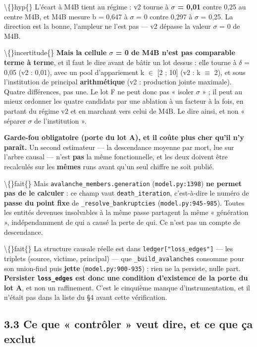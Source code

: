 \documentclass[11pt,a4paper]{article}
\newcommand{\code}[1]{\texttt{#1}}
\begin{document}
\textbackslash\{\}hyp\{\} L'écart à M4B tient au régime : v2 tourne à \textbf{\ensuremath{\sigma} = 0,01} contre 0,25 au centre M4B, et M4B mesure b = 0,647 à \ensuremath{\sigma} = 0 contre 0,297 à \ensuremath{\sigma} = 0,25. La direction est la bonne, l'ampleur ne l'est pas --- v2 dépasse la valeur \ensuremath{\sigma} = 0 de M4B.

\textbackslash\{\}incertitude\{\} \textbf{Mais la cellule \ensuremath{\sigma} = 0 de M4B n'est pas comparable terme à terme}, et il faut le dire avant de bâtir un lot dessus : elle tourne à \ensuremath{\delta} = 0,05 (v2 : 0,01), avec un pool d'appariement k \ensuremath{\in} [2 ; 10] (v2 : k \ensuremath{\equiv} 2), et sous l'institution de principal \textbf{arithmétique} (v2 : production jointe maximale). Quatre différences, pas une. Le lot F ne peut donc pas « isoler \ensuremath{\sigma} » ; il peut au mieux ordonner les quatre candidats par une ablation à un facteur à la fois, en partant du régime v2 et en marchant vers celui de M4B. Le dire ainsi, et non « séparer \ensuremath{\sigma} de l'institution ».

\textbf{Garde-fou obligatoire (porte du lot A), et il coûte plus cher qu'il n'y paraît.} Un second estimateur --- la descendance moyenne par mort, lue sur l'arbre causal --- n'est \textbf{pas} la même fonctionnelle, et les deux doivent être recalculés sur les \textbf{mêmes} runs avant qu'un seul chiffre ne soit publié.

\textbackslash\{\}fait\{\} Mais \code{avalanche\_members.generation} (\code{model.py:1398}) \textbf{ne permet pas de le calculer} : ce champ vaut \code{death\_iteration}, c'est-à-dire le numéro de \textbf{passe du point fixe} de \code{\_resolve\_bankruptcies} (\code{model.py:945-985}). Toutes les entités devenues insolvables à la même passe partagent la même « génération », indépendamment de qui a causé la perte de qui. Ce n'est pas un compte de descendance.

\textbackslash\{\}fait\{\} La structure causale réelle est dans \code{ledger["loss\_edges"]} --- les triplets (source, victime, principal) --- que \code{\_build\_avalanches} consomme pour son union-find puis \textbf{jette} (\code{model.py:900-935}) : rien ne la persiste, nulle part. \textbf{Persister \code{loss\_edges} est donc une condition d'existence de la porte du lot A}, et non un raffinement. C'est le cinquième manque d'instrumentation, et il n'était pas dans la liste du §4 avant cette vérification.

\subsection*{3.3 Ce que « contrôler » veut dire, et ce que ça exclut}
\end{document}
